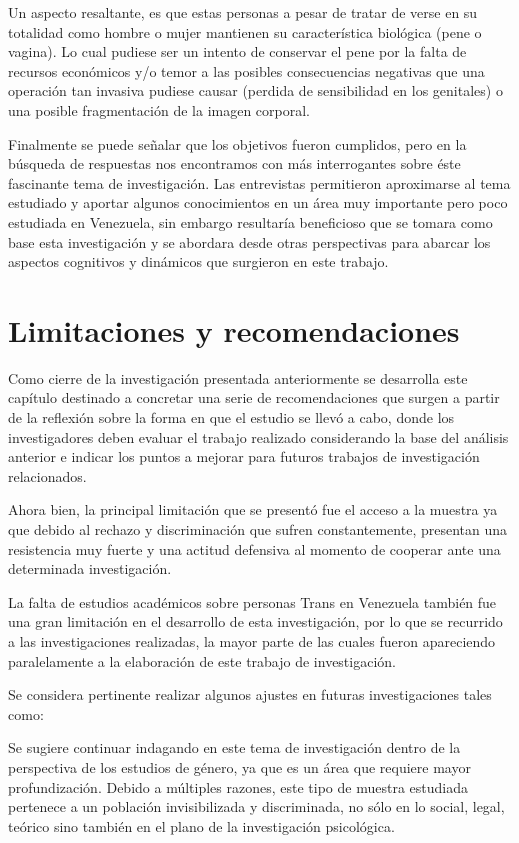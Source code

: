 Un aspecto resaltante, es que estas personas a pesar de tratar de verse en su
totalidad como hombre o mujer mantienen su característica biológica (pene o
vagina). Lo cual pudiese ser un intento de conservar el pene por la falta de
recursos económicos y/o temor a las posibles consecuencias negativas que una
operación tan invasiva pudiese causar (perdida de sensibilidad en los genitales)
o una posible fragmentación de la imagen corporal.

Finalmente se puede señalar que los objetivos fueron cumplidos, pero en la
búsqueda de respuestas nos encontramos con más interrogantes sobre éste
fascinante tema de investigación. Las entrevistas permitieron aproximarse al
tema estudiado y aportar algunos conocimientos en un área muy importante pero
poco estudiada en Venezuela, sin embargo resultaría beneficioso que se tomara
como base esta investigación y se abordara desde otras perspectivas para abarcar
los aspectos cognitivos y dinámicos que surgieron en este trabajo.


\section{Limitaciones y recomendaciones}

Como cierre de la investigación presentada anteriormente se desarrolla este
capítulo destinado a concretar  una serie de recomendaciones que surgen a partir
de la reflexión sobre la forma en que el estudio se llevó a cabo, donde los
investigadores deben evaluar el trabajo realizado considerando la base del
análisis anterior e indicar los puntos a mejorar para futuros trabajos de
investigación relacionados.

Ahora bien, la principal limitación que se presentó fue el acceso a la muestra
ya que debido al rechazo y discriminación que sufren constantemente, presentan
una resistencia muy fuerte y una actitud defensiva al momento de cooperar ante
una determinada investigación.

La falta de estudios académicos sobre personas Trans en Venezuela también fue
una gran limitación en el desarrollo de esta investigación, por lo que se
recurrido a las investigaciones realizadas, la mayor parte de las cuales fueron
apareciendo paralelamente a la elaboración de este trabajo de investigación.

Se considera pertinente realizar algunos ajustes en futuras investigaciones
tales como:

Se sugiere continuar indagando en este tema de investigación dentro de la
perspectiva de los estudios de género, ya que es un área que requiere mayor
profundización. Debido a múltiples razones, este tipo de muestra estudiada
pertenece a un población invisibilizada y discriminada, no sólo en lo social,
legal, teórico sino también en el plano de la investigación psicológica.

